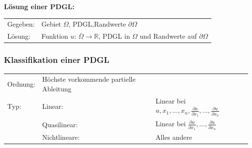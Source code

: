 \textbf{Lösung einer PDGL:}\\
\begin{tabular}{ll}
Gegeben:& Gebiet $\Omega$, PDGL,Randwerte $\partial\Omega$\\
Lösung:& Funktion $u$: $\overset{\_}{\Omega}\rightarrow \mathbb{R}$, PDGL in $\Omega$ und Randwerte auf $\partial\Omega$\\
\end{tabular}

\subsubsection{Klassifikation einer PDGL}
\begin{tabular}{lll}
Ordnung:& Höchste vorkommende partielle Ableitung\\
Typ:& Linear: & Linear bei $u, x_1,...,x_n, \frac{\partial u}{\partial x_1},\ldots,\frac{\partial u}{\partial x_n}$\\
& Quasilinear: &  Linear bei $\frac{\partial u}{\partial x_1},\ldots,\frac{\partial u}{\partial x_n}$\\
& Nichtlineare: & Alles andere
\end{tabular}








%



